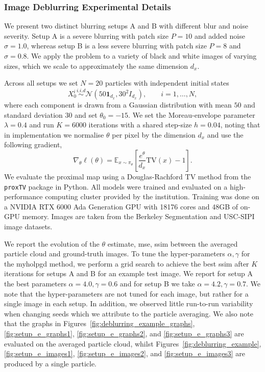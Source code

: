 \subsubsection{Image Deblurring Experimental Details}

We present two distinct blurring setups A and B with different blur and noise severity. Setup A is a severe blurring with patch size $P=10$ and added noise $\sigma=1.0$, whereas setup B is a less severe blurring with patch size $P=8$ and $\sigma=0.8$. We apply the problem to a variety of black and white images of varying sizes, which we scale to approximately the same dimension $d_x$.

Across all setups we set $N=20$ particles with independent initial states
\begin{equation*}
    X^i_0\overset{i.i.d}{\sim}\mathcal{N}(50\mathbf{1}_{d_x},30^2I_{d_x}),\qquad i=1,\ldots,N,
\end{equation*}
where each component is drawn from a Gaussian distribution with mean $50$ and standard deviation $30$ and set $\theta_0=-15$. We set the Moreau-envelope parameter $\lambda=0.4$ and run $K=6000$ iterations with a shared step-size $h=0.04$, noting that in implementation we normalise $\theta$ per pixel by the dimension $d_x$ and use the following gradient,
\begin{equation*}
    \nabla_\theta\ell(\theta)
    =
    \mathbb{E}_{x\sim \pi_\theta}
    \left[\frac{e^\theta}{d_x}\mathrm{TV}(x)-1\right].
\end{equation*}
We evaluate the proximal map using a Douglas-Rachford $\mathrm{TV}$ method from the \texttt{proxTV} package in Python. All models were trained and evaluated on a high-performance computing cluster provided by the institution. Training was done on a NVIDIA RTX 6000 Ada Generation GPU with 18176 cores and 48GB of on-GPU memory. Images are taken from the Berkeley Segmentation and USC-SIPI image datasets.

We report the evolution of the $\theta$ estimate, \gls*{mse}, \gls*{ssim} between the averaged particle cloud and ground-truth images. To tune the hyper-parameters $\alpha,\gamma$ for the \gls*{myholpgd} method, we perform a grid search to achieve the best \gls{ssim} after $K$ iterations for setups A and B for an example test image. We report for setup A the best parameters $\alpha=4.0,\gamma=0.6$ and for setup B we take $\alpha=4.2,\gamma=0.7$. We note that the hyper-parameters are not tuned for each image, but rather for a single image in each setup. In addition, we observed little run-to-run variability when changing seeds which we attribute to the particle averaging. We also note that the graphs in Figures~\ref{fig:deblurring_example_graphs}, \ref{fig:setup_e_graphs1}, \ref{fig:setup_e_graphs2}, and \ref{fig:setup_e_graphs3} are evaluated on the averaged particle cloud, whilst Figures~\ref{fig:deblurring_example}, \ref{fig:setup_e_images1}, \ref{fig:setup_e_images2}, and \ref{fig:setup_e_images3} are produced by a single particle.

